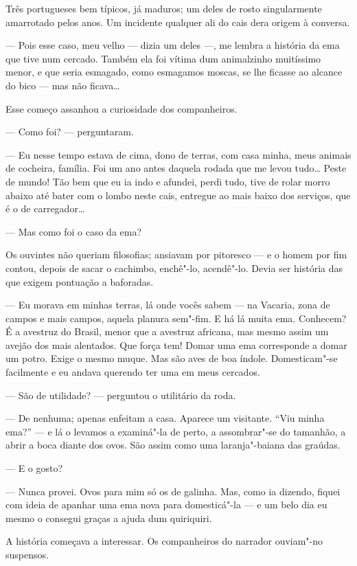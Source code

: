 Três portugueses bem típicos, já maduros; um deles de rosto
singularmente amarrotado pelos anos. Um incidente qualquer ali do cais
dera origem à conversa.

--- Pois esse caso, meu velho --- dizia um deles ---, me lembra a
história da ema que tive num cercado. Também ela foi vítima dum
animalzinho muitíssimo menor, e que seria esmagado, como esmagamos
moscas, se lhe ficasse ao alcance do bico --- mas não ficava\ldots{}

Esse começo assanhou a curiosidade dos companheiros.

--- Como foi? --- perguntaram.

--- Eu nesse tempo estava de cima, dono de terras, com casa minha, meus
animais de cocheira, família. Foi um ano antes daquela rodada que me
levou tudo\ldots{} Peste de mundo! Tão bem que eu ia indo e afundei, perdi
tudo, tive de rolar morro abaixo até bater com o lombo neste cais,
entregue ao mais baixo dos serviços, que é o de carregador\ldots{}

--- Mas como foi o caso da ema?

Os ouvintes não queriam filosofias; ansiavam por pitoresco --- e o homem
por fim contou, depois de sacar o cachimbo, enchê"-lo, acendê"-lo. Devia
ser história das que exigem pontuação a baforadas.

--- Eu morava em minhas terras, lá onde vocês sabem --- na Vacaria, zona
de campos e mais campos, aquela planura sem"-fim. E há lá muita ema.
Conhecem? É a avestruz do Brasil, menor que a avestruz africana, mas
mesmo assim um avejão dos mais alentados. Que força tem! Domar uma ema
corresponde a domar um potro. Exige o mesmo muque. Mas são aves de boa
índole. Domesticam"-se facilmente e eu andava querendo ter uma em meus
cercados.

--- São de utilidade? --- perguntou o utilitário da roda.

--- De nenhuma; apenas enfeitam a casa. Aparece um visitante. ``Viu
minha ema?'' --- e lá o levamos a examiná"-la de perto, a assombrar"-se do
tamanhão, a abrir a boca diante dos ovos. São assim como uma
laranja"-baiana das graúdas.

--- E o gosto?

--- Nunca provei. Ovos para mim só os de galinha. Mas, como ia dizendo,
fiquei com ideia de apanhar uma ema nova para domesticá"-la --- e um belo
dia eu mesmo o consegui graças a ajuda dum quiriquiri.

A história começava a interessar. Os companheiros do narrador ouviam"-no
suspensos.

